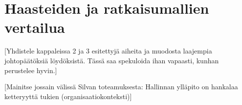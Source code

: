 \chapter{Haasteiden ja ratkaisumallien vertailua}

[Yhdistele kappaleissa 2 ja 3 esitettyjä aiheita ja muodosta laajempia johtopäätöksiä löydöksistä. Tässä saa spekuloida ihan vapaasti, kunhan perustelee hyvin.]

[Mainitse jossain välissä Silvan toteamuksesta: Hallinnan ylläpito on hankalaa ketteryyttä tukien (organisaatiokonteksti)]